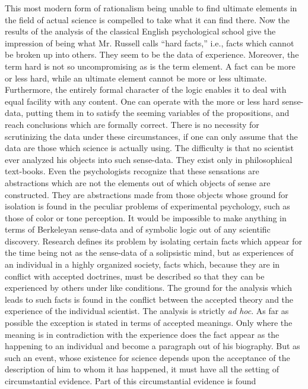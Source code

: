 \documentclass[12pt]{article}
\begin{document}
This most modern form of rationalism being unable
to find ultimate elements in the field of actual science
is compelled to take what it can find there. Now the
results of the analysis of the classical English psychological
school give the impression of being what Mr.
Russell calls ``hard facts,'' i.e., facts which cannot be
broken up into others. They seem to be the data of
experience. Moreover, the term hard is not so uncompromising
as is the term element. A fact can be more
or less hard, while an ultimate element cannot be more
or less ultimate. Furthermore, the entirely formal
character of the logic enables it to deal with equal
facility with any content. One can operate with the
more or less hard sense-data, putting them in to satisfy
the seeming variables of the propositions, and reach
conclusions which are formally correct. There is no
necessity for scrutinizing the data under these circumstances,
if one can only assume that the data are those
which science is actually using. The difficulty is that
no scientist ever analyzed his objects into such sense-data.
They exist only in philosophical text-books.
Even the psychologists recognize that these sensations
are abstractions which are not the elements out of which
objects of sense are constructed. They are abstractions
made from those objects whose ground for isolation
is found in the peculiar problems of experimental
psychology, such as those of color or tone perception.
It would be impossible to make anything in terms of
Berkeleyan sense-data and of symbolic logic out of any
scientific discovery. Research defines its problem by
isolating certain facts which appear for the time being
not as the sense-data of a solipsistic mind, but as experiences
of an individual in a highly organized society,
facts which, because they are in conflict with accepted
doctrines, must be described so that they can be
experienced by others under like conditions. The
ground for the analysis which leads to such facts is
found in the conflict between the accepted theory and
the experience of the individual scientist. The analysis
is strictly \emph{ad hoc}. As far as possible the exception is
stated in terms of accepted meanings. Only where the
meaning is in contradiction with the experience does
the fact appear as the happening to an individual and
become a paragraph out of his biography. But as such
an event, whose existence for science depends upon the
acceptance of the description of him to whom it has
happened, it must have all the setting of circumstantial
evidence. Part of this circumstantial evidence is found
\end{document}
